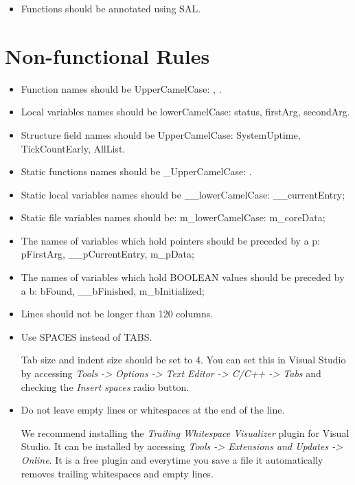 \begin{appendices}
\begin{itemize}
	\item Functions should be annotated using SAL.
\end{itemize}

\section{Non-functional Rules}
\begin{itemize}
	\item Function names should be UpperCamelCase: , .
	\item Local variables names should be lowerCamelCase: status, firstArg, secondArg.
	\item Structure field names should be UpperCamelCase: SystemUptime, TickCountEarly, AllList.

	\item Static functions names should be \_UpperCamelCase: .
	\item Static local variables names should be \_\_lowerCamelCase: \_\_currentEntry;
	\item Static file variables names should be: m\_lowerCamelCase: m\_coreData;

	\item The names of variables which hold pointers should be preceded by a p: pFirstArg,
\_\_pCurrentEntry, m\_pData;
	\item The names of variables which hold BOOLEAN values should be preceded by a b: bFound,
\_\_bFinished, m\_bInitialized;

	\item Lines should not be longer than 120 columns.

	\item Use SPACES instead of TABS.

	Tab size and indent size should be set to 4. You can set this in Visual Studio by accessing \textit{Tools -> Options -> Text Editor -> C/C++ -> Tabs} and checking the \textit{Insert spaces} radio button.

	\item Do not leave empty lines or whitespaces at the end of the line.

	We recommend installing the \textit{Trailing Whitespace Visualizer} plugin for Visual Studio. It can be installed by accessing \textit{Tools -> Extensions and Updates -> Online}. It is a free plugin and everytime you save a file it automatically removes trailing whitespaces and empty lines.

\end{itemize}


\end{appendices}